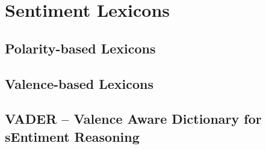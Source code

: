 


\section{Sentiment Lexicons} \label{sec:lexicons}

\subsection{Polarity-based Lexicons} \label{subsec:polbas}
\subsection{Valence-based Lexicons}



\subsection{VADER – Valence Aware Dictionary for sEntiment Reasoning} \label{subsec:vader}

